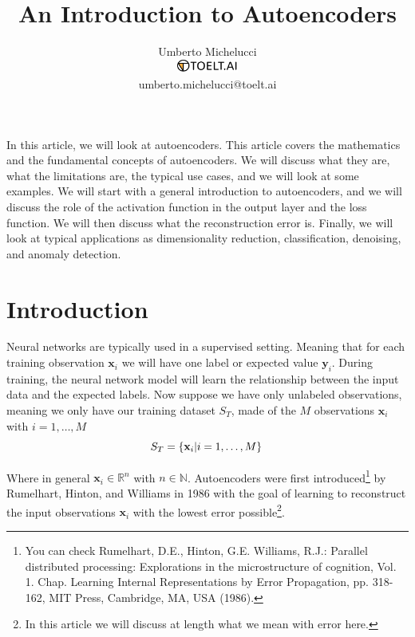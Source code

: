 \documentclass[12pt,a4]{article}
\title{An Introduction to Autoencoders}
\author{Umberto Michelucci\\[3px]\includegraphics[width=2cm]{toelt_logo.png}\\[-5px]umberto.michelucci@toelt.ai}
\begin{document}
\maketitle 



In this article, we will look at autoencoders. This article covers the
mathematics and the fundamental concepts of autoencoders. We will
discuss what they are, what the limitations are, the typical use
cases, and we will look at some examples. We will start with a general
introduction to autoencoders, and we will discuss the role of the
activation function in the output layer and the loss function. We will
then discuss what the reconstruction error is. Finally, we will look
at typical applications as dimensionality reduction, classification,
denoising, and anomaly detection.


\section{Introduction}

Neural networks are typically used in a supervised setting. Meaning that for each training observation \(\mathbf{x}_{i}\)\textbf{ }we will have one label or expected value \(\mathbf{y}_{i}\). During training, the neural network model will learn the relationship between the input data and the expected labels. Now suppose we have only unlabeled observations, meaning we only have our training dataset \( S_{T}\), made of the \( M\) observations \(\mathbf{x}_{i}\) with \( i = 1,\ldots ,M\)
%
\begin{equation}
S_{T} =\left\{\mathbf{x}_{i} \vert  i = 1,\ldots ,M\right\}   \\ 
\end{equation}


%
Where in general \(\mathbf{x}_{i}\in\mathbb{R}^{n}\) with \( n\in\mathbb{N}\). Autoencoders were first introduced\footnote{ You can check Rumelhart, D.E., Hinton, G.E. Williams, R.J.: Parallel distributed processing: Explorations in the microstructure of cognition, Vol. 1. Chap. Learning Internal Representations by Error Propagation, pp. 318-162, MIT Press, Cambridge, MA, USA (1986).} by Rumelhart, Hinton, and Williams in 1986 with the goal of learning to reconstruct the input observations \(\mathbf{x}_{i}\) with the lowest error possible\footnote{ In this article we will discuss at length what we mean with error here.}.
\end{document}
